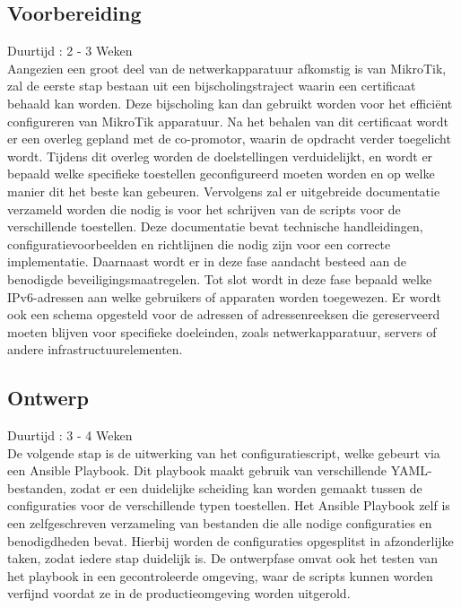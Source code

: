 \subsection{Voorbereiding}
\label{sec:voorbereiding}
{\small Duurtijd : 2 - 3 Weken}\\

Aangezien een groot deel van de netwerkapparatuur afkomstig is van MikroTik, zal de eerste stap bestaan uit een bijscholingstraject waarin een certificaat behaald kan worden.
Deze bijscholing kan dan gebruikt worden voor het efficiënt configureren van MikroTik apparatuur.
Na het behalen van dit certificaat wordt er een overleg gepland met de co-promotor, waarin de opdracht verder toegelicht wordt. 
Tijdens dit overleg worden de doelstellingen verduidelijkt, en wordt er bepaald welke specifieke toestellen geconfigureerd moeten worden en op welke manier dit het beste kan gebeuren. 
Vervolgens zal er uitgebreide documentatie verzameld worden die nodig is voor het schrijven van de scripts voor de verschillende toestellen. 
Deze documentatie bevat technische handleidingen, configuratievoorbeelden en richtlijnen die nodig zijn voor een correcte implementatie. 
Daarnaast wordt er in deze fase aandacht besteed aan de benodigde beveiligingsmaatregelen. 
Tot slot wordt in deze fase bepaald welke IPv6-adressen aan welke gebruikers of apparaten worden toegewezen. 
Er wordt ook een schema opgesteld voor de adressen of adressenreeksen die gereserveerd moeten blijven voor specifieke doeleinden, zoals netwerkapparatuur, 
servers of andere infrastructuurelementen.

\subsection{Ontwerp}
\label{sec:ontwerp}
{\small Duurtijd : 3 - 4 Weken}\\

De volgende stap is de uitwerking van het configuratiescript, welke gebeurt via een Ansible Playbook. 
Dit playbook maakt gebruik van verschillende YAML-bestanden, zodat er een duidelijke scheiding kan worden gemaakt tussen de configuraties voor de verschillende typen toestellen. 
Het Ansible Playbook zelf is een zelfgeschreven verzameling van bestanden die alle nodige configuraties en benodigdheden bevat. 
Hierbij worden de configuraties opgesplitst in afzonderlijke taken, zodat iedere stap duidelijk is. 
De ontwerpfase omvat ook het testen van het playbook in een gecontroleerde omgeving, waar de scripts kunnen worden verfijnd voordat ze in de productieomgeving worden uitgerold.

